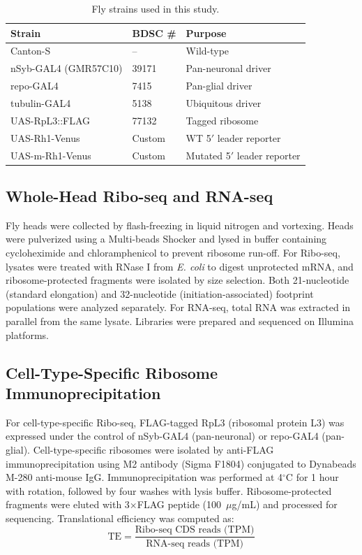 \documentclass[12pt]{article}
\begin{document}
\begin{table}[ht]
\centering
\caption{Fly strains used in this study.}
\label{tab:strains}
\begin{tabular}{lll}
\toprule
Strain & BDSC \# & Purpose \\
\midrule
Canton-S & -- & Wild-type \\
nSyb-GAL4 (GMR57C10) & 39171 & Pan-neuronal driver \\
repo-GAL4 & 7415 & Pan-glial driver \\
tubulin-GAL4 & 5138 & Ubiquitous driver \\
UAS-RpL3::FLAG & 77132 & Tagged ribosome \\
UAS-Rh1-Venus & Custom & WT 5$'$ leader reporter \\
UAS-m-Rh1-Venus & Custom & Mutated 5$'$ leader reporter \\
\bottomrule
\end{tabular}
\end{table}

\subsection{Whole-Head Ribo-seq and RNA-seq}

Fly heads were collected by flash-freezing in liquid nitrogen and vortexing. Heads were pulverized using a Multi-beads Shocker and lysed in buffer containing cycloheximide and chloramphenicol to prevent ribosome run-off. For Ribo-seq, lysates were treated with RNase I from \textit{E. coli} to digest unprotected mRNA, and ribosome-protected fragments were isolated by size selection. Both 21-nucleotide (standard elongation) and 32-nucleotide (initiation-associated) footprint populations were analyzed separately. For RNA-seq, total RNA was extracted in parallel from the same lysate. Libraries were prepared and sequenced on Illumina platforms.

\subsection{Cell-Type-Specific Ribosome Immunoprecipitation}

For cell-type-specific Ribo-seq, FLAG-tagged RpL3 (ribosomal protein L3) was expressed under the control of nSyb-GAL4 (pan-neuronal) or repo-GAL4 (pan-glial). Cell-type-specific ribosomes were isolated by anti-FLAG immunoprecipitation using M2 antibody (Sigma F1804) conjugated to Dynabeads M-280 anti-mouse IgG. Immunoprecipitation was performed at 4$^{\circ}$C for 1 hour with rotation, followed by four washes with lysis buffer. Ribosome-protected fragments were eluted with 3$\times$FLAG peptide (100~$\mu$g/mL) and processed for sequencing. Translational efficiency was computed as:
\begin{equation}
\text{TE} = \frac{\text{Ribo-seq CDS reads (TPM)}}{\text{RNA-seq reads (TPM)}}
\end{equation}
\end{document}
